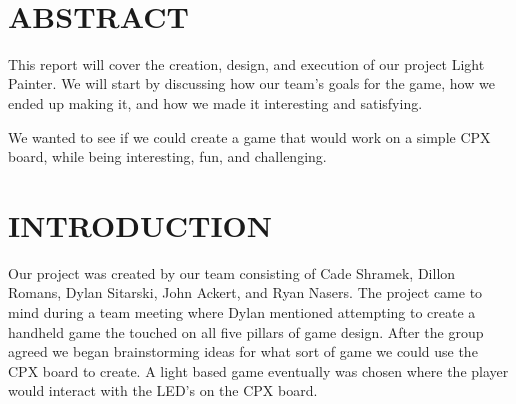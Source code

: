 \documentclass[12pt]{article}
\begin{document}
\begin{titlepage}
\begin{minipage}{0.8\textwidth}
\begin{flushleft}
		\end{flushleft}
	\end{minipage}\\[2 cm]
	
	\vfill
	
\end{titlepage}

\tableofcontents
\pagebreak

\section{ABSTRACT}

This report will cover the creation, design, and execution of our project Light Painter. We will start by discussing how our team's goals for the game, how we ended up making it, and how we made it interesting and satisfying. 

We wanted to see if we could create a game that would work on a simple CPX board, while being interesting, fun, and challenging. 

\section{INTRODUCTION}

Our project was created by our team consisting of Cade Shramek, Dillon Romans, Dylan Sitarski, John Ackert, and Ryan Nasers. The project came to mind during a team meeting where Dylan mentioned attempting to create a handheld game the touched on all five pillars of game design. After the group agreed we began brainstorming ideas for what sort of game we could use the CPX board to create. A light based game eventually was chosen where the player would interact with the LED's on the CPX board. 
\end{document}
